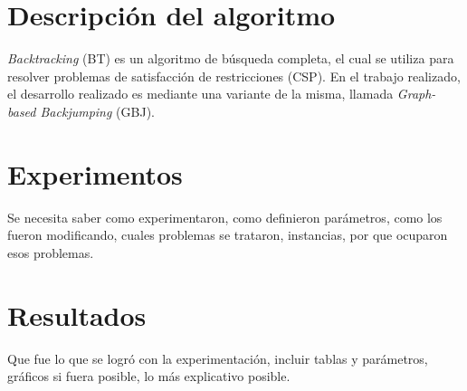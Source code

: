 \documentclass[letter, 10pt]{article}
\begin{document}
\section{Descripción del algoritmo}
\textit{Backtracking} (BT) es un algoritmo de búsqueda completa, el cual se utiliza para resolver problemas de satisfacción de restricciones (CSP). En el trabajo realizado, el desarrollo realizado es mediante una variante de la misma, llamada \textit{Graph-based Backjumping} (GBJ).

\section{Experimentos}
Se necesita saber como experimentaron, como definieron par\'ametros, como los fueron modificando, cuales 
problemas se trataron, instancias, por que ocuparon esos problemas.

\section{Resultados}
Que fue lo que se logr\'o con la experimentaci\'on, incluir tablas y par\'ametros, gr\'aficos si fuera
posible, lo m\'as explicativo posible.
\end{document}
